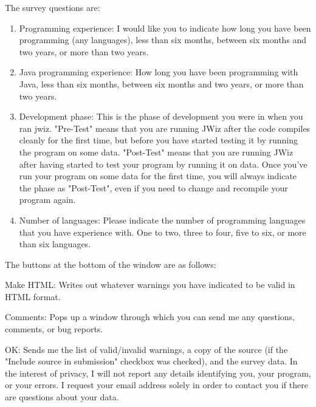       The survey questions are:

      \begin{enumerate}
      \item Programming experience:  I would like you to indicate how long
      you have been programming (any languages), less than six months,
      between six months and two years, or more than two years.
      \item Java programming experience: How long you have been programming
      with Java, less than six months, between six months and two years, or
      more than two years.
      \item Development phase: This is the phase of development you were in
      when you ran jwiz.  "Pre-Test" means that you are
      running JWiz after the code compiles cleanly for the
      first time, but
      before you have started testing it by running the
      program on some data.  "Post-Test" means that you are
      running JWiz after having started to test your program 
      by running it on data.  Once you've run your program
      on some data for the first time, you will always
      indicate the phase as "Post-Test", even if you need to 
      change and recompile your program again.
      \item Number of languages:  Please indicate the number of programming
      languages that you have experience with. One to two, three to four,
      five to six, or more than six languages.
    \end{enumerate}

    The buttons at the bottom of the window are as follows:

      Make HTML: Writes out whatever warnings you have indicated to be
      valid in HTML format.

      Comments: Pops up a window through which you can send me any
      questions, comments, or bug reports. 

      OK: Sends me the list of valid/invalid warnings, a
      copy of the source (if the "Include source in
      submission" checkbox was checked), and the survey
      data.  In the interest of privacy, I will not report
      any details identifying you, your program, or your
      errors.  I request your email address solely in order
      to contact you if there are questions about your
      data. 


\normalsize

\newpage


